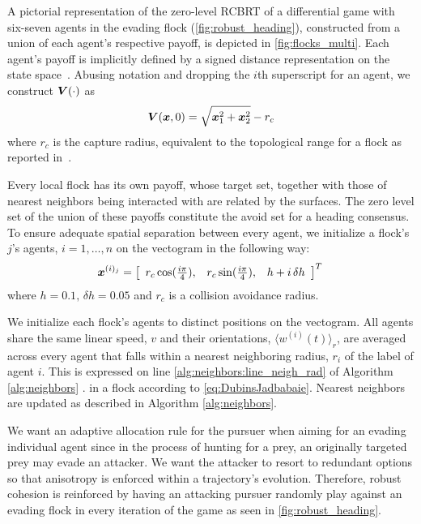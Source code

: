 %
A pictorial representation of the zero-level RCBRT of a differential  game with six-seven agents in the evading flock (\cf\autoref{fig:robust_heading}), constructed from a union of each agent's respective payoff,  is depicted in \autoref{fig:flocks_multi}. Each agent's payoff is implicitly defined by a signed distance representation on the state space~\cite{LevelSetsBook}. Abusing notation and dropping the $i$th superscript for an agent, we construct $\bm{V}(\cdot)$ as 
%
\begin{align}
	\bm{V}(\bm{x}, 0) = \sqrt{\bm{x}_1^2 + \bm{x}_2^2} - r_c
\end{align}
%
where $r_c$ is the capture radius, equivalent to the topological range for a flock as reported in~\cite{Ballerini1232}. 


Every local flock has its own payoff, whose target set, together with those of nearest neighbors being interacted with are related by the surfaces. The zero level set of the union of these payoffs constitute the avoid set for a heading consensus. To ensure adequate spatial separation between every agent, we initialize a flock's $j$'s agents, $i=1,\ldots, n$ on the vectogram in the following way:
%
\begin{align}
	\state^{(i)_j} = \left[\begin{array}{ccc}
		r_c \cos (\frac{i\pi}{4}), & 	r_c \sin (\frac{i\pi}{4}), & h+i\,\delta h
	\end{array}\right]^T \, %
\end{align}
%
where $h=0.1, \, \delta h = 0.05$ and $r_c$ is a collision avoidance radius.

We initialize each flock's agents to distinct positions on the vectogram. All agents share the same linear speed, $v$ and their orientations, $\langle w^{(i)} (t) \rangle_r$, are averaged  across every agent that falls within a nearest neighboring radius, $r_i$ of the label of agent $i$. This is expressed on line \ref{alg:neighbors:line_neigh_rad} of Algorithm \ref{alg:neighbors} . in a flock according to \eqref{eq:DubinsJadbabaie}. Nearest neighbors are updated as described in Algorithm \ref{alg:neighbors}. 

We want an adaptive allocation rule for the pursuer when aiming for an evading individual agent since in the process of hunting for a prey, an originally targeted prey may evade an attacker. We want the attacker to resort to redundant options so that anisotropy is enforced within a trajectory's evolution. Therefore, robust cohesion is reinforced by having an attacking  pursuer randomly play against an evading flock in every iteration of the game as seen in \autoref{fig:robust_heading}. 


